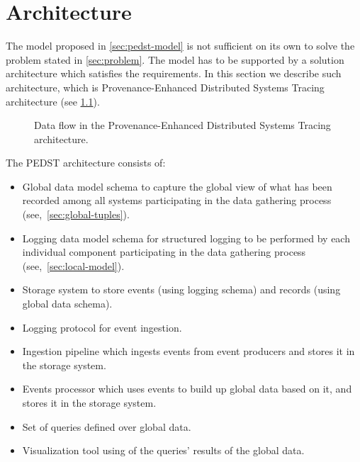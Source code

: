 \newpage
\chapter{Architecture}\label{sec:arch}

The model proposed in \cref{sec:pedst-model} is not sufficient on its own to solve the problem stated in \cref{sec:problem}. The model has to be supported by a solution architecture which satisfies the requirements. In this section we describe such architecture, which is Provenance-Enhanced Distributed Systems Tracing architecture (see \cref{fig:arch}).

\begin{figure}[htpb]
    \centering
    \caption{Data flow in the Provenance-Enhanced Distributed Systems Tracing architecture.}
    \label{fig:arch}
\end{figure}

The PEDST architecture consists of:
%
\begin{itemize}
	\item Global data model schema to capture the global view of what has been recorded among all systems participating in the data gathering process (see,~\cref{sec:global-tuples}).
	\item Logging data model schema for structured logging to be performed by each individual component participating in the data gathering process (see,~\cref{sec:local-model}).
	\item Storage system to store events (using logging schema) and records (using global data schema).
	\item Logging protocol for event ingestion.
	\item Ingestion pipeline which ingests events from event producers and stores it in the storage system.
	\item Events processor which uses events to build up global data based on it, and stores it in the storage system.
	\item Set of queries defined over global data.
	\item Visualization tool using of the queries' results of the global data.
\end{itemize}

